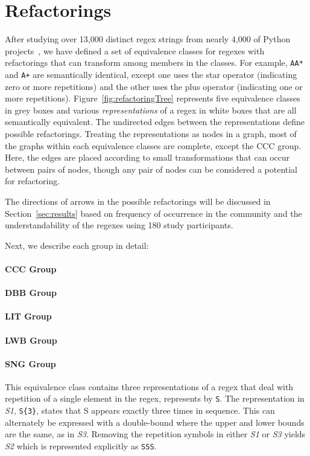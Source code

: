 \section{Refactorings}
\label{sec:refactoring}
After studying over 13,000 distinct regex strings from nearly 4,000 of Python projects~\cite{chapman2016}, we have defined a set of equivalence classes for regexes with refactorings that can transform among members in the classes. For example,  \verb!AA*! and \verb!A+! are semantically identical, except one uses the star operator (indicating zero or more repetitions) and the other uses the plus operator (indicating one or more repetitions). Figure~\ref{fig:refactoringTree} represents five equivalence classes in grey boxes and various \emph{representations} of a regex in white boxes that are all semantically equivalent. 
The undirected edges between the representations define possible refactorings. Treating the representations as nodes in a graph, most of the graphs within each equivalence classes are complete, except the CCC group. Here, the edges are placed according to small transformations that can occur between pairs of nodes, though any pair of nodes can be considered a potential for refactoring. 

The directions of arrows in the possible refactorings will be discussed in Section~\ref{sec:results} based on frequency of occurrence in the community and the understandability of the regexes using 180 study participants. 

Next, we describe each group in detail: 
\paragraph{CCC Group}

\paragraph{DBB Group}
\paragraph{LIT Group}
\paragraph{LWB Group}
\paragraph{SNG Group} This equivalence class contains  three representations of a regex that  deal with repetition of a single element in the regex, represents by \verb!S!. The representation in \emph{S1}, \verb!S{3}!, states that S appears exactly three times in sequence. This can alternately be expressed with a double-bound where the upper and lower bounds are the same, as in \emph{S3}. Removing the repetition symbols in either \emph{S1} or \emph{S3} yields \emph{S2} which is represented explicitly as  \verb!SSS!.  

